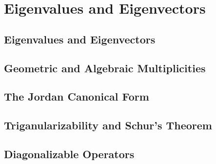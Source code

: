 \chapter{Eigenvalues and Eigenvectors}
\section{Eigenvalues and Eigenvectors}
\section{Geometric and Algebraic Multiplicities}
\section{The Jordan Canonical Form}
\section{Triganularizability and Schur's Theorem}
\section{Diagonalizable Operators}
